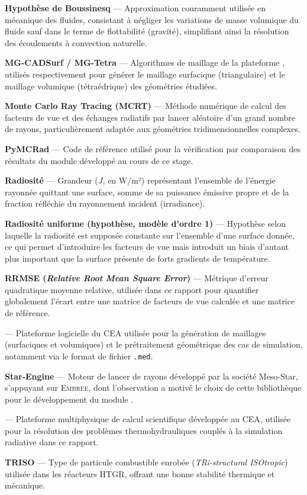 \textbf{Hypothèse de Boussinesq} — Approximation couramment utilisée en mécanique des fluides, consistant à négliger les variations de masse volumique du fluide sauf dans le terme de flottabilité (gravité), simplifiant ainsi la résolution des écoulements à convection naturelle.

\textbf{MG-CADSurf / MG-Tetra} — Algorithmes de maillage de la plateforme \salome, utilisés respectivement pour générer le maillage surfacique (triangulaire) et le maillage volumique (tétraédrique) des géométries étudiées.

\textbf{Monte Carlo Ray Tracing (MCRT)} — Méthode numérique de calcul des facteurs de vue et des échanges radiatifs par lancer aléatoire d'un grand nombre de rayons, particulièrement adaptée aux géométries tridimensionnelles complexes.

\textbf{PyMCRad} — Code de référence utilisé pour la vérification par comparaison des résultats du module développé au cours de ce stage.

\textbf{Radiosité} — Grandeur ($J$, en W/m²) représentant l'ensemble de l'énergie rayonnée quittant une surface, somme de sa puissance émissive propre et de la fraction réfléchie du rayonnement incident (irradiance).

\textbf{Radiosité uniforme (hypothèse, modèle d'ordre 1)} — Hypothèse selon laquelle la radiosité est supposée constante sur l'ensemble d'une surface donnée, ce qui permet d'introduire les facteurs de vue mais introduit un biais d'autant plus important que la surface présente de forts gradients de température.

\textbf{RRMSE (\textit{Relative Root Mean Square Error})} — Métrique d'erreur quadratique moyenne relative, utilisée dans ce rapport pour quantifier globalement l'écart entre une matrice de facteurs de vue calculée et une matrice de référence.

\textbf{\salome} — Plateforme logicielle du CEA utilisée pour la génération de maillages (surfaciques et volumiques) et le prétraitement géométrique des cas de simulation, notamment via le format de fichier \texttt{.med}.

\textbf{Star-Engine} — Moteur de lancer de rayons développé par la société Meso-Star, s'appuyant sur \textsc{Embree}, dont l'observation a motivé le choix de cette bibliothèque pour le développement du module \ETT.

\textbf{\trust} — Plateforme multiphysique de calcul scientifique développée au CEA, utilisée pour la résolution des problèmes thermohydrauliques couplés à la simulation radiative dans ce rapport.

\textbf{TRISO} — Type de particule combustible enrobée (\textit{TRi-structural ISOtropic}) utilisée dans les réacteurs HTGR, offrant une bonne stabilité thermique et mécanique.
